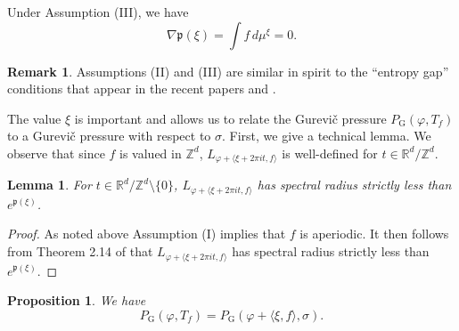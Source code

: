 \documentclass[11pt,letterpaper]{amsart}
\newtheorem{proposition}[theorem]{Proposition}
\newtheorem{lemma}[theorem]{Lemma}
\theoremstyle{definition}
\newtheorem{remark}[theorem]{Remark}
\numberwithin{equation}{section}
\numberwithin{theorem}{section}
\def\Z{\mathbb{Z}}
\def\R{\mathbb{R}}
\def\vp{\varphi}
\def\R{\mathbb R}
\def\Z{\mathbb Z}
\def\PG{P_{\mathrm{G}}}
\begin{document}
\medskip

Under Assumption (III), we have
\[
\nabla \mathfrak p(\xi)= \int f \, d\mu^\xi =0.
\]


\begin{remark}
Assumptions (II) and (III) are similar in spirit to the ``entropy gap'' conditions that appear in the recent
papers 
\cite{BCKM} and \cite{KM}.
\end{remark}

The value $\xi$ is important and allows us to relate the Gurevi\v{c} pressure $\PG(\vp,T_f)$
to a Gurevi\v{c} pressure with respect to $\sigma$. First, we give a technical lemma.
We observe that since $f$ is valued in $\Z^d$, $L_{\vp+\langle \xi+2\pi it,f\rangle}$ is well-defined 
for $t \in \R^d/\Z^d$.

\begin{lemma}\label{lem:smaller_spectral_radius}
For $t \in \R^d/\Z^d \setminus \{0\}$,
$L_{\vp + \langle \xi +2\pi it,f \rangle}$
has spectral radius strictly less than $e^{\mathfrak p(\xi)}$.
\end{lemma}

\begin{proof}
As noted above Assumption (I) implies that $f$ is aperiodic. It then follows from Theorem 2.14 of
\cite{KK} that $L_{\vp + \langle \xi +2\pi it,f \rangle}$
has spectral radius strictly less than $e^{\mathfrak p(\xi)}$.
\end{proof}


\begin{proposition}\label{prop:magic_xi}
We have
\[
\PG(\vp,T_f) = \PG(\vp+\langle \xi,f\rangle,\sigma).
\]
\end{proposition}
\end{document}
